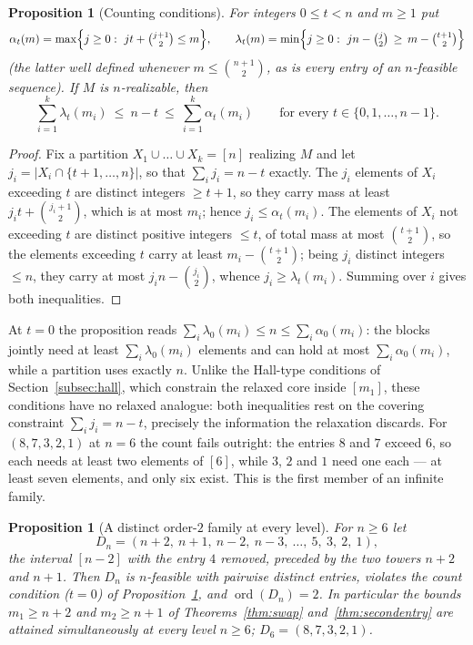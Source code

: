 \documentclass[11pt]{article}
\newtheorem{proposition}[theorem]{Proposition}
\theoremstyle{definition}
\theoremstyle{remark}
\newcommand{\ord}{\operatorname{ord}}
\newcommand{\intv}[1]{[#1]}
\begin{document}
\begin{proposition}[Counting conditions]\label{prop:counting}
For integers $0\le t<n$ and $m\ge1$ put
\[
\alpha_t(m)=\max\Bigl\{j\ge0:\ jt+\tbinom{j+1}{2}\le m\Bigr\},
\qquad
\lambda_t(m)=\min\Bigl\{j\ge0:\ jn-\tbinom{j}{2}\,\ge\, m-\tbinom{t+1}{2}\Bigr\}
\]
(the latter well defined whenever $m\le\binom{n+1}{2}$, as is every entry of an
$n$-feasible sequence). If $M$ is $n$-realizable, then
\[
\sum_{i=1}^{k}\lambda_t(m_i)\ \le\ n-t\ \le\ \sum_{i=1}^{k}\alpha_t(m_i)
\qquad\text{for every } t\in\{0,1,\dots,n-1\}.
\]
\end{proposition}

\begin{proof}
Fix a partition $X_1\cup\dots\cup X_k=\intv n$ realizing $M$ and let
$j_i=|X_i\cap\{t+1,\dots,n\}|$, so that $\sum_ij_i=n-t$ exactly. The $j_i$ elements
of $X_i$ exceeding $t$ are distinct integers $\ge t+1$, so they carry mass at least
$j_it+\binom{j_i+1}{2}$, which is at most $m_i$; hence $j_i\le\alpha_t(m_i)$. The
elements of $X_i$ not exceeding $t$ are distinct positive integers $\le t$, of total
mass at most $\binom{t+1}{2}$, so the elements exceeding $t$ carry at least
$m_i-\binom{t+1}{2}$; being $j_i$ distinct integers $\le n$, they carry at most
$j_in-\binom{j_i}{2}$, whence $j_i\ge\lambda_t(m_i)$. Summing over $i$ gives both
inequalities.
\end{proof}

At $t=0$ the proposition reads $\sum_i\lambda_0(m_i)\le n\le\sum_i\alpha_0(m_i)$:
the blocks jointly need at least $\sum_i\lambda_0(m_i)$ elements and can hold at
most $\sum_i\alpha_0(m_i)$, while a partition uses exactly $n$. Unlike the
Hall-type conditions of Section~\ref{subsec:hall}, which constrain the relaxed core
inside $\intv{m_1}$, these conditions have no relaxed analogue: both inequalities
rest on the covering constraint $\sum_ij_i=n-t$, precisely the information the
relaxation discards. For $(8,7,3,2,1)$ at $n=6$ the count fails outright: the
entries $8$ and $7$ exceed $6$, so each needs at least two elements of $\intv6$,
while $3$, $2$ and $1$ need one each --- at least seven elements, and only six
exist. This is the first member of an infinite family.

\begin{proposition}[A distinct order-$2$ family at every level]\label{prop:Dn}
For $n\ge6$ let
\[
D_n=(n+2,\ n+1,\ n-2,\ n-3,\ \dots,\ 5,\ 3,\ 2,\ 1),
\]
the interval $\intv{n-2}$ with the entry $4$ removed, preceded by the two towers
$n+2$ and $n+1$. Then $D_n$ is $n$-feasible with pairwise distinct entries, violates
the count condition ($t=0$) of Proposition~\ref{prop:counting}, and
$\ord(D_n)=2$. In particular the bounds $m_1\ge n+2$ and $m_2\ge n+1$ of
Theorems~\ref{thm:swap} and~\ref{thm:secondentry} are attained simultaneously at
every level $n\ge6$; $D_6=(8,7,3,2,1)$.
\end{proposition}
\end{document}
